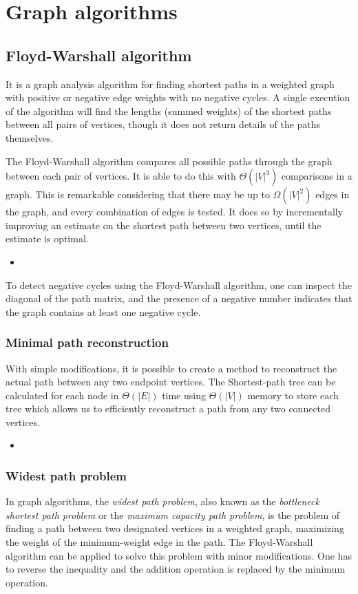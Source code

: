 \documentclass[a4paper, twoside,openany]{book}
\newcommand{\insertcode}[2]{\begin{itemize}\item[]\end{itemize}} %
\begin{document}
\chapter{Graph algorithms}
\section{Floyd-Warshall algorithm}
It is a graph analysis algorithm for finding shortest paths in a weighted graph with positive or negative edge weights with no negative cycles.
A single execution of the algorithm will find the lengths (summed weights) of the shortest paths between all pairs of vertices, though it does not return details of the paths themselves.

The Floyd-Warshall algorithm compares all possible paths through the graph between each pair of vertices.
It is able to do this with $\Theta(|V|^3)$ comparisons in a graph. 
This is remarkable considering that there may be up to $\Omega(|V|^2)$ edges in the graph, and every combination of edges is tested. 
It does so by incrementally improving an estimate on the shortest path between two vertices, until the estimate is optimal. 

\insertcode{"codes/floyd_warshall.cpp"}{A C++ code for the Floyd-Warshall algorithm} %

To detect negative cycles using the Floyd-Warshall algorithm, one can inspect the diagonal of the path matrix, and the presence of a negative number indicates that the graph contains at least one negative cycle.

\subsection{Minimal path reconstruction} 
With simple modifications, it is possible to create a method to reconstruct the actual path between any two endpoint vertices. 
The Shortest-path tree can be calculated for each node in $\Theta(|E|)$ time using $\Theta(|V|)$ memory to store each tree which allows us to efficiently reconstruct a path from any two connected vertices.

\insertcode{"codes/floyd_warshall_reconstruct.cpp"}{A C++ code for the Floyd-Warshall algorithm with information about the minimal path.} 

\subsection{Widest path problem}
In graph algorithms, the \emph{widest path problem}, also known as the \emph{bottleneck shortest path problem} or the \emph{maximum capacity path problem}, is the problem of finding a path between two designated vertices in a weighted graph, maximizing the weight of the minimum-weight edge in the path.
The Floyd-Warshall algorithm can be applied to solve this problem with minor modifications.
One has to reverse the inequality and the addition operation is replaced by the minimum operation.
\end{document}

